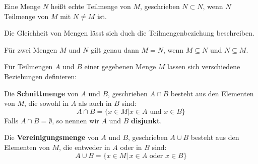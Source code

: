 \begin{notiz} Eine Menge $N$ heißt echte Teilmenge von $M$, geschrieben $N \subset 
N$, wenn $N$ Teilmenge von $M$ mit $N \neq M$ ist.
\end{notiz}

Die Gleichheit von Mengen lässt sich duch die Teilmengenbeziehung beschreiben.

\begin{satz} Für zwei Mengen $M$ und $N$ gilt genau dann $M = N$, wenn $M \subseteq N$ und $N \subseteq M$. 
\end{satz}

Für Teilmengen $A$ und $B$ einer gegebenen Menge $M$ lassen sich verschiedene Beziehungen definieren:

\begin{definition} Die \textbf{Schnittmenge} von $A$ und $B$, geschrieben $A \cap B$ 
besteht aus den Elementen von $M$, die sowohl in $A$ als auch in $B$ sind:
  $$ A \cap B = \{ x \in M \vert x \in A \textrm{ und } x \in B \} $$
Falls $A \cap B = \emptyset$, so nennen wir $A$ und $B$ \textbf{disjunkt}.
\end{definition}

	\begin{figure}[H]
	\vspace{-0.4cm}
		\begin{center}
		\begin{scaletikzpicturetowidth}{0.55\textwidth}
     			 
		\end{scaletikzpicturetowidth}
		\end{center}
	\vspace{-0.8cm}
	\end{figure}

\begin{definition} Die \textbf{Vereinigungsmenge} von $A$ und $B$, geschrieben $A \cup B$ 
besteht aus den Elementen von $M$, die entweder in $A$ oder in $B$ sind:
  $$ A \cup B = \{ x \in M \vert \, x \in A \textrm{ oder } x \in B \} $$
\end{definition}

	\begin{figure}[H]
	\vspace{-0.4cm}
		\begin{center}
		\begin{scaletikzpicturetowidth}{0.55\textwidth}
     			 
		\end{scaletikzpicturetowidth}
		\end{center}
	\vspace{-0.8cm}
	\end{figure}


